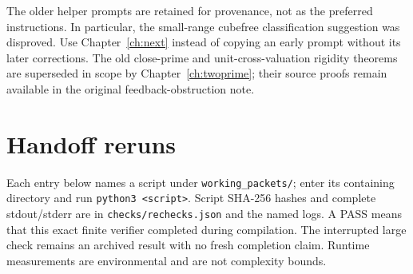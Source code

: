 The older helper prompts are retained for provenance, not as the preferred
instructions. In particular, the small-range cubefree classification suggestion
was disproved. Use Chapter~\ref{ch:next} instead of copying an early prompt
without its later corrections. The old close-prime and unit-cross-valuation
rigidity theorems are superseded in scope by Chapter~\ref{ch:twoprime}; their
source proofs remain available in the original feedback-obstruction note.

\section{Handoff reruns}
Each entry below names a script under \texttt{working\_packets/}; enter its
containing directory and run \texttt{python3 <script>}. Script SHA-256 hashes
and complete stdout/stderr are in \texttt{checks/rechecks.json} and the named
logs. A PASS means that this exact finite verifier completed during compilation.
The interrupted large check remains an archived result with no fresh completion
claim. Runtime measurements are environmental and are not complexity bounds.

